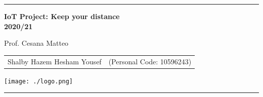 \documentclass{article}
\begin{document}
\setlength\parindent{0pt} %
\setlength\parskip{1em}

\begin{titlepage}
	\centering
	\hrule
	
	\vspace{6,5cm}
	{\Huge \textbf{IoT Project: Keep your distance\\
		2020/21}\\}
		
		\vspace{0,5cm}
		\large {Prof. Cesana Matteo}
		
		\vspace{2,5cm}
		{
			\large
			\begin{tabular}{c c}
				Shalby Hazem Hesham Yousef & (Personal Code: 10596243) \\
			\end{tabular}
			
		}
		\vspace{5cm}
		\vspace{0,5cm}
		
		\centering\hspace{0,2cm}\texttt{[image: ./logo.png]}
		\vspace{0,5cm}
		\hrule
		
		\end{titlepage}
		
		\pagebreak
		
		\pagebreak
		
\end{document}
